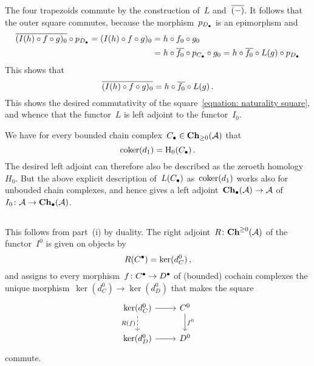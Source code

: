 The four trapezoids commute by the construction of~$L$ and~$\overline{(-)}$.
It follows that the outer square commutes, because the morphism~$p_{D_\bullet}$ is an epimorphsm and
\begin{align*}
      \overline{ (I(h) \circ f \circ g)_0 } \circ p_{D_\bullet}
   =  (I(h) \circ f \circ g)_0
  &=  h \circ f_0 \circ g_0 \\
  &=  h \circ \overline{f_0} \circ p_{C_\bullet} \circ g_0
   =  h \circ \overline{f_0} \circ L(g) \circ p_{D_\bullet}
\end{align*}
This shows that
\[
    \overline{ (I(h) \circ f \circ g)_0 }
  = h \circ \overline{f_0} \circ L(g) \,.
\]
This shows the desired commutativity of the square~\eqref{equation: naturality square}, and whence that the functor~$L$ is left adjoint to the functor~$I_0$.

\begin{remark}
  We have for every bounded chain complex~$C_\bullet \in \mathbf{Ch}_{\geq 0}(\mathcal{A})$ that
  \[
    \operatorname{coker}(d_1)
    =
    \operatorname{H}_0(C_\bullet) \,.
  \]
  The desired left adjoint can therefore also be described as the zeroeth homology~$H_0$.
  But the above explicit description of~$L(C_\bullet)$ as~$\operatorname{coker}(d_1)$ works also for unbouded chain complexes, and hence gives a left adjoint~$\mathbf{Ch}_\bullet(\mathcal{A}) \to \mathcal{A}$ of~$I_0 \colon \mathcal{A} \to \mathbf{Ch}_\bullet(\mathcal{A})$.
\end{remark}





\subsection{}

This follows from part~(i) by duality.
The right adjoint~$R \colon \mathbf{Ch}^{\geq 0}(\mathcal{A})$ of the functor~$I^0$ is given on objects by
\[
    R(C^\bullet)
  = \ker(d_C^0) \,,
\]
and assigns to every morphism~$f \colon C^\bullet \to D^\bullet$ of (bounded) cochain complexes the unique morphism~$\ker(d_C^0) \to \ker(d_D^0)$ that makes the square
\[
  \begin{tikzcd}
      \ker(d_C^0)
      \arrow{r}
      \arrow[dashed]{d}[left]{R(f)}
    & C^0
      \arrow{d}[right]{f^0}
    \\
      \ker(d_D^0)
      \arrow{r}
    & D^0
  \end{tikzcd}
\]
commute.



